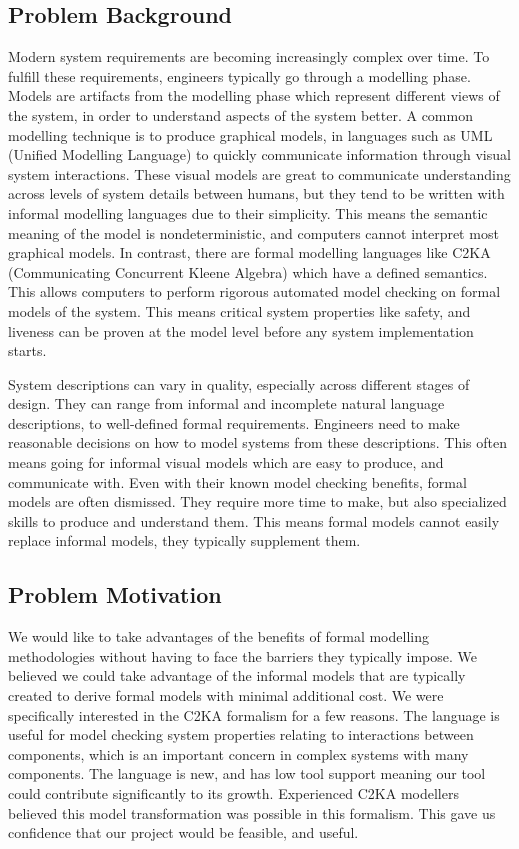 \subsection{Problem Background}\label{subsec:problem-background}
Modern system requirements are becoming increasingly complex over time.
To fulfill these requirements, engineers typically go through a modelling phase.
Models are artifacts from the modelling phase which represent different views of the system, in order to understand aspects of the system better.
A common modelling technique is to produce graphical models, in languages such as UML (Unified Modelling Language) to quickly communicate information through visual system interactions.
These visual models are great to communicate understanding across levels of system details between humans,
but they tend to be written with informal modelling languages due to their simplicity.
This means the semantic meaning of the model is nondeterministic, and computers cannot interpret most graphical models.
In contrast, there are formal modelling languages like C2KA (Communicating Concurrent Kleene Algebra) which have a defined semantics.
This allows computers to perform rigorous automated model checking on formal models of the system.
This means critical system properties like safety, and liveness can be proven at the model level before any system implementation starts.

System descriptions can vary in quality, especially across different stages of design.
They can range from informal and incomplete natural language descriptions,
to well-defined formal requirements.
Engineers need to make reasonable decisions on how to model systems from these descriptions.
This often means going for informal visual models which are easy to produce, and communicate with.
Even with their known model checking benefits, formal models are often dismissed.
They require more time to make, but also specialized skills to produce and understand them.
This means formal models cannot easily replace informal models, they typically supplement them.

\subsection{Problem Motivation}\label{subsec:problem-motivation}
We would like to take advantages of the benefits of formal modelling methodologies without having to face the barriers they typically impose.
We believed we could take advantage of the informal models that are typically created to derive formal models with minimal additional cost.
We were specifically interested in the C2KA formalism for a few reasons.
The language is useful for model checking system properties relating to interactions between components, which is an important concern in complex systems with many components.
The language is new, and has low tool support meaning our tool could contribute significantly to its growth.
Experienced C2KA modellers believed this model transformation was possible in this formalism.
This gave us confidence that our project would be feasible, and useful.

